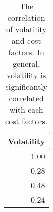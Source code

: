 \begin{table}
\centering
\caption{The correlation of volatility and cost factors. In general, volatility is significantly correlated with each cost factors.
}
\label{tbl:corr_vol}
\begin{tabular}{r}
\toprule
 Volatility \\
\midrule
       1.00 \\
       0.28 \\
       0.48 \\
       0.24 \\
\bottomrule
\end{tabular}
\end{table}

